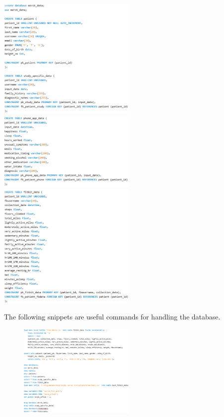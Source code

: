 \documentclass[]{book}
\begin{document}
\includegraphics[width=0.50000\textwidth]{./images/a3.png}
\includegraphics[width=0.50000\textwidth]{./images/a4.png}
\includegraphics[width=0.50000\textwidth]{./images/a5.png}

The following snippets are useful commands for handling the database.

\begin{figure}
\centering
\includegraphics[width=0.50000\textwidth]{./images/a6.png}
\caption{}
\end{figure}
\end{document}
